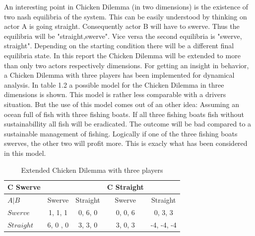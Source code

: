 \documentclass[11pt]{article}
\begin{document}
An interesting point in Chicken Dilemma (in two dimensions) is the existence of two nash equilibria of the system. This can be easily understood by thinking on actor A is going straight. Consequently actor B will have to swerve. Thus the equilibria will be "straight,swerve". Vice versa the second equilibria is "swerve, straight". Depending on the starting condition there will be a different final equilibria state.
\newline
In this report the Chicken Dilemma will be extended to more than only two actors respectively dimensions. For getting an insight in behavior, a Chicken Dilemma with three players has been implemented for dynamical analysis. In table 1.2 a possible model for the Chicken Dilemma in three dimensions is shown. This model is rather less comparable with a drivers situation. But the use of this model comes out of an other idea: Assuming an ocean full of fish with three fishing boats. If all three fishing boats fish without sustainabillity all fish will be eradicated. The outcome will be bad compared to a sustainable management of fishing. Logically if one of the three fishing boats swerves, the other two will profit more. This is exacly what has been considered in this model.

\begin{table}[htbp]
\centering
\begin{tabular}{|l|c|c|c|c|}


\hline
 C Swerve  & & &  C Straight   &  \\
\hline
$ A | B $     &     Swerve  &    Straight &  Swerve  &  Straight   \\                           
\hline
$ Swerve $      &  1,  1, 1     &  0, 6, 0  & 0, 0, 6 & 0, 3, 3  \\
\hline
$ Straight $      &  6, 0 , 0    &  3, 3, 0   & 3, 0, 3 & -4, -4, -4    \\
\hline

                      
\end{tabular}

\label{table2}   
\caption{Extended Chicken Dilemma with three players}

\end{table}
\end{document}

